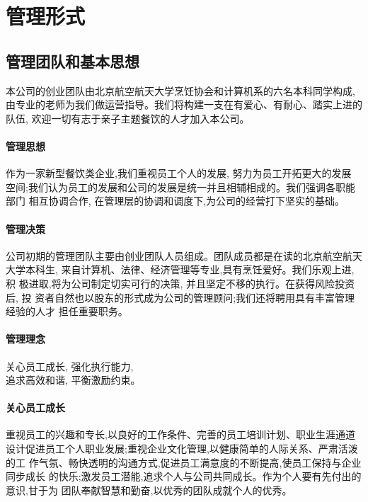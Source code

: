 \section{管理形式}
\subsection{管理团队和基本思想}
本公司的创业团队由北京航空航天大学烹饪协会和计算机系的六名本科同学构成,
由专业的老师为我们做运营指导。我们将构建一支在有爱心、有耐心、踏实上进的队伍,
欢迎一切有志于亲子主题餐饮的人才加入本公司。

\paragraph{管理思想}
作为一家新型餐饮类企业,我们重视员工个人的发展, 努力为员工开拓更大的发展
空间;我们认为员工的发展和公司的发展是统一并且相辅相成的。我们强调各职能部门
相互协调合作, 在管理层的协调和调度下,为公司的经营打下坚实的基础。

\paragraph{管理决策}
公司初期的管理团队主要由创业团队人员组成。团队成员都是在读的北京航空航天
大学本科生, 来自计算机、法律、经济管理等专业,具有烹饪爱好。我们乐观上进,积
极进取,将为公司制定切实可行的决策, 并且坚定不移的执行。在获得风险投资后, 投
资者自然也以股东的形式成为公司的管理顾问;我们还将聘用具有丰富管理经验的人才
担任重要职务。

\paragraph{管理理念}
\begin{center}
        关心员工成长, 强化执行能力,\\
        追求高效和谐, 平衡激励约束。
\end{center}

\paragraph{关心员工成长}
重视员工的兴趣和专长,以良好的工作条件、完善的员工培训计划、职业生涯通道
设计促进员工个人职业发展;重视企业文化管理,以健康简单的人际关系、严肃活泼的工
作气氛、畅快透明的沟通方式,促进员工满意度的不断提高,使员工保持与企业同步成长
的快乐;激发员工潜能,追求个人与公司共同成长。作为个人要有先付出的意识,甘于为
团队奉献智慧和勤奋,以优秀的团队成就个人的优秀。

